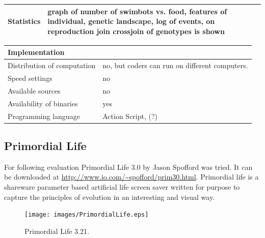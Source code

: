 \documentclass[a4paper,12pt]{report}
\begin{document}
 \vspace{10pt}
 \begin{tabular}{|p{150pt}|p{220pt}|} \hline \textbf{Statistics}&graph of number of swimbots vs. food, features of individual, genetic landscape, log of events, on reproduction join crossjoin of genotypes is shown \\ \hline
\end{tabular} 

 \vspace{10pt}
 \begin{tabular}{|p{150pt}|p{220pt}|} \hline \textbf{Implementation}& \\ \hline
Distribution of computation&no, but coders can run on different computers. \\ \hline
Speed settings&no \\ \hline
Available sources&no \\ \hline
Availability of binaries&yes \\ \hline
Programming language&Action Script, (?) \\ \hline
\end{tabular}

\subsection {Primordial Life}
For following evaluation Primordial Life 3.0 by Jason Spofford was tried. It can be downloaded at \url{http://www.io.com/~spofford/prim30.html}. Primordial life is a shareware parameter based artificial life screen saver written for purpose to capture the principles of evolution in an interesting and visual way.

\begin{figure}
\begin{center}
  \texttt{[image: images/PrimordialLife.eps]}
  \caption{Primordial Life 3.21.}
  \label{img.PrimordialLife}
\end{center}
\end{figure}
\end{document}
